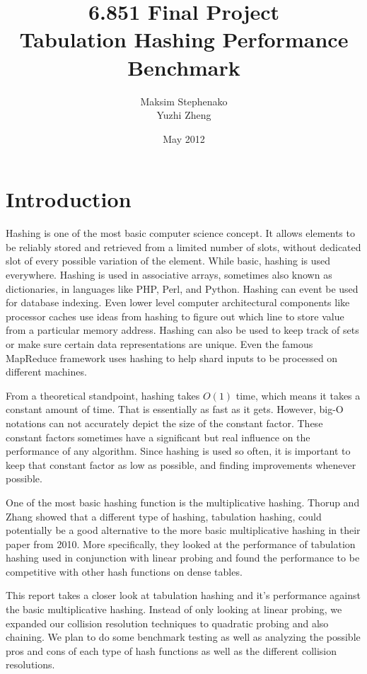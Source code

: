 \documentclass[11pt]{article}
\title{6.851 Final Project \\ Tabulation Hashing Performance Benchmark}
\author{Maksim Stephenako \\ Yuzhi Zheng}
\date{May 2012}
\begin{document}
\setlength{\baselineskip}{1.15\baselineskip}

\ifpdf
{}
\else
{}
\fi

\maketitle

\section{Introduction}
Hashing is one of the most basic computer science concept. 
It allows elements to be reliably stored and 
retrieved from a limited number of slots, without dedicated slot of every possible 
variation of the element. While basic, hashing is used everywhere. Hashing is used in 
associative arrays, sometimes also known as dictionaries, in languages like 
PHP, Perl, and Python. Hashing can event be used for database indexing. 
Even lower level computer architectural components like processor caches 
use ideas from hashing to figure out which line to store value from a particular
memory address. Hashing can also be used to keep track of sets or make 
sure certain data representations are unique. Even the famous MapReduce
framework uses hashing to help shard inputs to be processed on different machines.

From a theoretical standpoint, hashing takes $O(1)$ time, which means it takes a constant
amount of time. That is essentially as fast as it gets. However, big-O notations can not
accurately depict the size of the constant factor. These constant factors sometimes
have a significant but real influence on the performance of any algorithm. 
Since hashing is used so often, it is important to keep that constant factor
as low as possible, and finding improvements whenever possible.

One of the most basic hashing function is the multiplicative hashing. 
Thorup and Zhang showed that a different type of hashing, tabulation hashing,
could potentially be a good alternative to the more basic multiplicative hashing 
in their paper from 2010. More specifically, they looked at the performance of tabulation hashing
used in conjunction with linear probing and found the performance to be competitive with
other hash functions on dense tables.

This report takes a closer look at tabulation hashing and it's performance 
against the basic multiplicative hashing. Instead of only looking at linear 
probing, we expanded our collision resolution techniques to quadratic probing 
and also chaining. We plan to do some benchmark testing as well as  
analyzing the possible pros and cons of each type of hash functions as 
well as the different collision resolutions.
\end{document}

